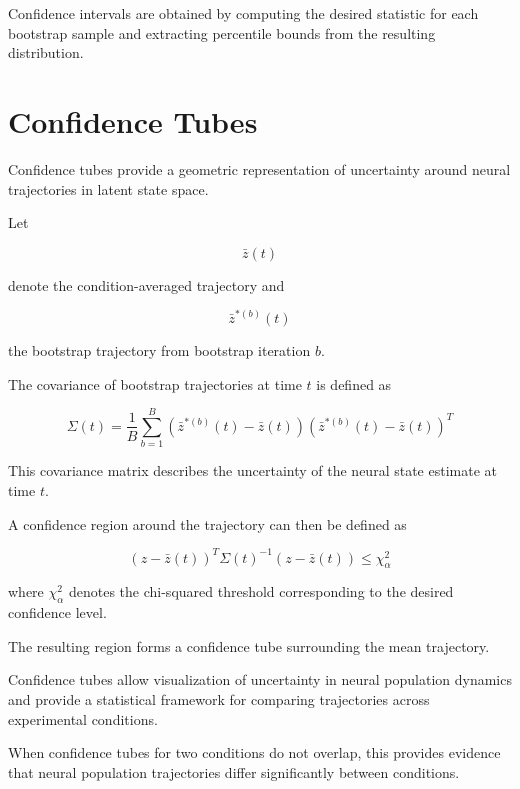 \documentclass[11pt]{report}
\begin{document}
Confidence intervals are obtained by computing the desired statistic
for each bootstrap sample and extracting percentile bounds from the
resulting distribution.

\section{Confidence Tubes}

Confidence tubes provide a geometric representation of uncertainty
around neural trajectories in latent state space.

Let

\begin{equation}
\bar{z}(t)
\end{equation}

denote the condition-averaged trajectory and

\begin{equation}
\bar{z}^{*(b)}(t)
\end{equation}

the bootstrap trajectory from bootstrap iteration $b$.

The covariance of bootstrap trajectories at time $t$ is defined as

\begin{equation}
\Sigma(t) =
\frac{1}{B}
\sum_{b=1}^{B}
(\bar{z}^{*(b)}(t) - \bar{z}(t))
(\bar{z}^{*(b)}(t) - \bar{z}(t))^T
\end{equation}

This covariance matrix describes the uncertainty of the neural state
estimate at time $t$.

A confidence region around the trajectory can then be defined as

\begin{equation}
(z - \bar{z}(t))^T \Sigma(t)^{-1} (z - \bar{z}(t)) \le \chi^2_{\alpha}
\end{equation}

where $\chi^2_{\alpha}$ denotes the chi-squared threshold corresponding
to the desired confidence level.

The resulting region forms a confidence tube surrounding the mean
trajectory.

Confidence tubes allow visualization of uncertainty in neural
population dynamics and provide a statistical framework for
comparing trajectories across experimental conditions.

When confidence tubes for two conditions do not overlap, this
provides evidence that neural population trajectories differ
significantly between conditions.
\end{document}
